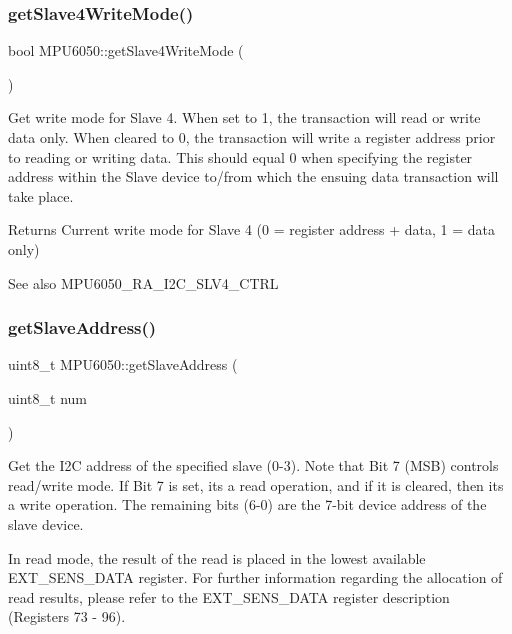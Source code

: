 \subsubsection{\texorpdfstring{getSlave4WriteMode()}{getSlave4WriteMode()}}
{\footnotesize\ttfamily bool M\+P\+U6050\+::get\+Slave4\+Write\+Mode (\begin{DoxyParamCaption}{ }\end{DoxyParamCaption})}

Get write mode for Slave 4. When set to 1, the transaction will read or write data only. When cleared to 0, the transaction will write a register address prior to reading or writing data. This should equal 0 when specifying the register address within the Slave device to/from which the ensuing data transaction will take place.

\begin{DoxyReturn}{Returns}
Current write mode for Slave 4 (0 = register address + data, 1 = data only) 
\end{DoxyReturn}
\begin{DoxySeeAlso}{See also}
M\+P\+U6050\+\_\+\+R\+A\+\_\+\+I2\+C\+\_\+\+S\+L\+V4\+\_\+\+C\+T\+RL 
\end{DoxySeeAlso}
\mbox{\label{class_m_p_u6050_af75b9f7ccac48515c7544238db0e6863}} 
\subsubsection{\texorpdfstring{getSlaveAddress()}{getSlaveAddress()}}
{\footnotesize\ttfamily uint8\+\_\+t M\+P\+U6050\+::get\+Slave\+Address (\begin{DoxyParamCaption}\item[{uint8\+\_\+t}]{num }\end{DoxyParamCaption})}

Get the I2C address of the specified slave (0-\/3). Note that Bit 7 (M\+SB) controls read/write mode. If Bit 7 is set, it\textquotesingle{}s a read operation, and if it is cleared, then it\textquotesingle{}s a write operation. The remaining bits (6-\/0) are the 7-\/bit device address of the slave device.

In read mode, the result of the read is placed in the lowest available E\+X\+T\+\_\+\+S\+E\+N\+S\+\_\+\+D\+A\+TA register. For further information regarding the allocation of read results, please refer to the E\+X\+T\+\_\+\+S\+E\+N\+S\+\_\+\+D\+A\+TA register description (Registers 73 -\/ 96).

